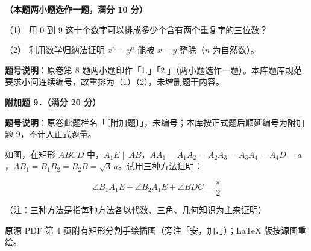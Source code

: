 \begin{question}
\textbf{（本题两小题选作一题，满分 10 分）} 

（1） 用 0 到 9 这十个数字可以排成多少个含有两个重复字的三位数？

（2） 利用数学归纳法证明 $x^n-y^n$ 能被 $x-y$ 整除（$n$ 为自然数）。

\begin{gktip}
\textbf{题号说明}：原卷第 8 题两小题印作「1.」「2.」（两小题选作一题）。本库题库规范要求小问连续编号，故重排为（1）（2），未增删题干内容。
\end{gktip}

\textbf{附加题 9．（满分 20 分）}

\begin{gktip}
\textbf{题号说明}：原卷此题栏名「〔附加题〕」，未编号；本库按正式题后顺延编号为附加题 9，不计入正式题量。
\end{gktip}

如图，在矩形 $ABCD$ 中，$A_1E\parallel AB$，$AA_1=A_1A_2=A_2A_3=A_3A_4=A_4D=a$，$AB_1=B_1B_2=B_2B=\sqrt3\,a$。试用三种方法证明：

\nopagebreak[4]
\[
\angle B_1A_1E+\angle B_2A_1E+\angle BDC=\frac{\pi}{2}
\]

（注：三种方法是指每种方法各以代数、三角、几何知识为主来证明）

\begin{gktip}
原源 PDF 第 4 页附有矩形分割手绘插图（旁注「安，加．」）；LaTeX 版按源图重绘。
\end{gktip}
\nopagebreak[4]
\begin{center}\end{center}
\nopagebreak[4]

\end{question}